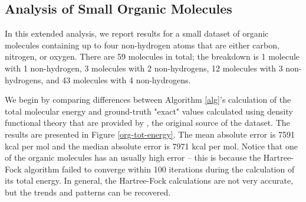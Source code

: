 \documentclass[12pt]{article}
\begin{document}
\subsection{Analysis of Small Organic Molecules}   

In this extended analysis, we report results for a small dataset of organic molecules containing up to four non-hydrogen atoms that are either carbon, nitrogen, or oxygen.  There are 59 molecules in total; the breakdown is 1 molecule with 1 non-hydrogen, 3 molecules with 2 non-hydrogens, 12 molecules with 3 non-hydrogens, and 43 molecules with 4 non-hydrogens.  

We begin by comparing differences between Algorithm \ref{alg}'s calculation of the total molecular energy and ground-truth "exact" values calculated using density functional theory that are provided by \cite{montavon2013}, the original source of the dataset.  The results are presented in Figure \ref{org-tot-energy}.  The mean absolute error is 7591 kcal per mol and the median absolute error is 7971 kcal per mol.  Notice that one of the organic molecules has an usually high error -- this is because the Hartree-Fock algorithm failed to converge within 100 iterations during the calculation of its total energy.  In general, the Hartree-Fock calculations are not very accurate, but the trends and patterns can be recovered. 
\end{document}
